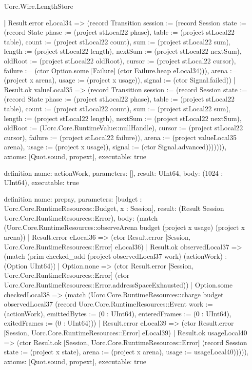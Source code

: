 \begin{lexlean}{Uorc.Wire.LengthStore}
\begin{semanticmodule}
{      | Result.error eLocal34 => (record Transition {session := (record Session {state := (record State {phase := (project stLocal22 phase), table := (project stLocal22 table), count := (project stLocal22 count), sum := (project stLocal22 sum), length := (project stLocal22 length), nextSum := (project stLocal22 nextSum), oldRoot := (project stLocal22 oldRoot), cursor := (project stLocal22 cursor), failure := (ctor Option.some [Failure] (ctor Failure.heap eLocal34))}), arena := (project x arena), usage := (project x usage)}), signal := (ctor Signal.failed)})
      | Result.ok valueLocal35 => (record Transition {session := (record Session {state := (record State {phase := (project stLocal22 phase), table := (project stLocal22 table), count := (project stLocal22 count), sum := (project stLocal22 sum), length := (project stLocal22 length), nextSum := (project stLocal22 nextSum), oldRoot := (Uorc.Core.RuntimeValue::nullHandle), cursor := (project stLocal22 cursor), failure := (project stLocal22 failure)}), arena := (project valueLocal35 arena), usage := (project x usage)}), signal := (ctor Signal.advanced)})))))),
  axioms: [Quot.sound, propext],
  executable: true
}

definition{
  name: actionWork,
  parameters: [],
  result: UInt64,
  body: (1024 : UInt64),
  executable: true
}

definition{
  name: prepay,
  parameters: [budget : Uorc.Core.RuntimeResources::Budget, x : Session],
  result: (Result Session Uorc.Core.RuntimeResources::Error),
  body: (match (Uorc.Core.RuntimeResources::observeArena budget (project x usage) (project x arena))
    | Result.error eLocal36 => (ctor Result.error [Session, Uorc.Core.RuntimeResources::Error] eLocal36)
    | Result.ok observedLocal37 => (match (prim checked_add (project observedLocal37 work) (actionWork) : (Option UInt64))
      | Option.none => (ctor Result.error [Session, Uorc.Core.RuntimeResources::Error] (ctor Uorc.Core.RuntimeResources::Error.addressSpaceExhausted))
      | Option.some checkedLocal38 => (match (Uorc.Core.RuntimeResources::charge budget observedLocal37 (record Uorc.Core.RuntimeResources::Event {work := (actionWork), emittedBytes := (0 : UInt64), enteredFrames := (0 : UInt64), exitedFrames := (0 : UInt64)}))
        | Result.error eLocal39 => (ctor Result.error [Session, Uorc.Core.RuntimeResources::Error] eLocal39)
        | Result.ok usageLocal40 => (ctor Result.ok [Session, Uorc.Core.RuntimeResources::Error] (record Session {state := (project x state), arena := (project x arena), usage := usageLocal40}))))),
  axioms: [Quot.sound, propext],
  executable: true
}


\end{semanticmodule}
\end{lexlean}
